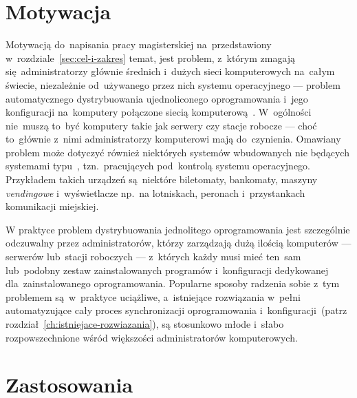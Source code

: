 \documentclass[thesis]{subfiles}
\begin{document}

\section{Motywacja}

Motywacją do~napisania pracy magisterskiej na~przedstawiony w~rozdziale~\ref{sec:cel-i-zakres} temat, jest problem, z~którym zmagają się~administratorzy głównie średnich i~dużych sieci komputerowych na~całym świecie, niezależnie od~używanego przez nich systemu operacyjnego --- problem automatycznego dystrybuowania ujednoliconego oprogramowania i~jego konfiguracji na~komputery połączone siecią komputerową~\cite{so-problem-intro}. W~ogólności nie~muszą to~być komputery takie jak serwery czy stacje robocze --- choć to~głównie z~nimi administratorzy komputerowi mają do~czynienia. Omawiany problem może dotyczyć również niektórych systemów wbudowanych nie będących systemami typu~\mbox{}, tzn.~pracujących pod~kontrolą systemu operacyjnego. Przykładem takich urządzeń są~niektóre biletomaty, bankomaty, maszyny \emph{vendingowe} i~wyświetlacze np.~na lotniskach, peronach i~przystankach komunikacji miejskiej.

W praktyce problem dystrybuowania jednolitego oprogramowania jest szczególnie odczuwalny przez administratorów, którzy zarządzają dużą ilością komputerów --- serwerów lub~stacji roboczych --- z~których każdy musi mieć ten~sam lub~podobny zestaw zainstalowanych programów i~konfiguracji dedykowanej dla~zainstalowanego oprogramowania. Popularne sposoby radzenia sobie z~tym problemem są~w~praktyce uciążliwe, a~istniejące rozwiązania w~pełni automatyzujące cały proces synchronizacji oprogramowania i~konfiguracji~(patrz rozdział~\ref{ch:istniejace-rozwiazania}), są stosunkowo młode i~słabo rozpowszechnione wśród większości administratorów komputerowych.


\section{Zastosowania}
\end{document}
